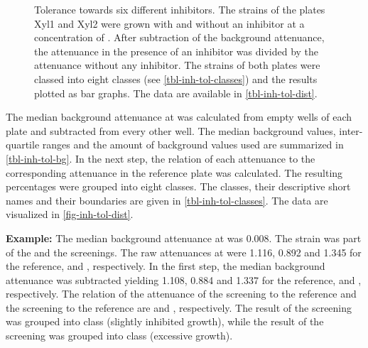 \begin{figure}
	\hfill

	\hfill

	\hfill
	\caption[Tolerance Towards Six Different Inhibitors]{Tolerance towards six different inhibitors. The strains of the plates Xyl1 and Xyl2 were grown with and without an inhibitor at a concentration of . After subtraction of the background attenuance, the attenuance in the presence of an inhibitor was divided by the attenuance without any inhibitor. The strains of both plates were classed into eight classes (see \vref{tbl-inh-tol-classes}) and the results plotted as bar graphs. The data are available in \vref{tbl-inh-tol-dist}.\label{fig-inh-tol-dist}}
\end{figure}
The median background attenuance at  was calculated from empty wells of each plate and subtracted from every other well. The median background values, inter-quartile ranges and the amount of background values used are summarized in \vref{tbl-inh-tol-bg}. In the next step, the relation of each attenuance to the corresponding attenuance in the reference plate was calculated. The resulting percentages were grouped into eight classes. The classes, their descriptive short names and their boundaries are given in \vref{tbl-inh-tol-classes}. The data are visualized in \vref{fig-inh-tol-dist}.

\textbf{Example:} The median background attenuance at  was \num{0.008}. The strain was part of the \fur{} and the \fora{} screenings. The raw attenuances at  were \num{1.116}, \num{0.892} and \num{1.345} for the reference, \fur{} and \fora{}, respectively. In the first step, the median background attenuance was subtracted yielding \num{1.108}, \num{0.884} and \num{1.337} for the reference, \fur{} and \fora{}, respectively. The relation of the attenuance of the \fur{} screening to the reference and the \fora{} screening to the reference are  and , respectively. The result of the \fur{} screening was grouped into class \romv{} (slightly inhibited growth), while the result of the \fora{} screening was grouped into class \romviii{} (excessive growth).

